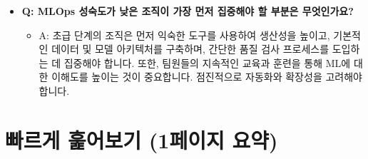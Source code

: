 \documentclass[11pt,a4paper]{article}
\begin{document}
\begin{itemize}
    \item \textbf{Q: MLOps 성숙도가 낮은 조직이 가장 먼저 집중해야 할 부분은 무엇인가요?}
    \begin{itemize}
        \item A: 초급 단계의 조직은 먼저 익숙한 도구를 사용하여 생산성을 높이고, 기본적인 데이터 및 모델 아키텍처를 구축하며, 간단한 품질 검사 프로세스를 도입하는 데 집중해야 합니다. 또한, 팀원들의 지속적인 교육과 훈련을 통해 ML에 대한 이해도를 높이는 것이 중요합니다. 점진적으로 자동화와 확장성을 고려해야 합니다.
    \end{itemize}
\end{itemize}

\newpage
\section{빠르게 훑어보기 (1페이지 요약)}
\end{document}
